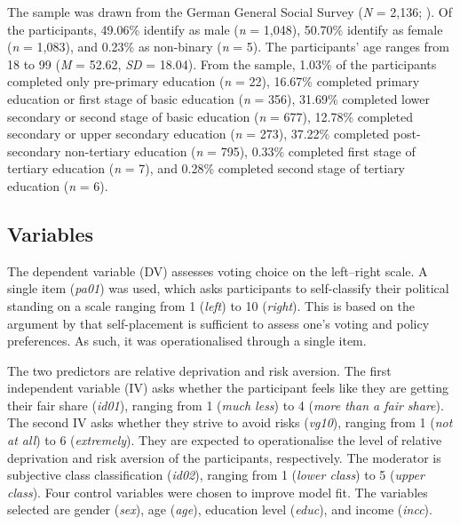 \documentclass[stu,12pt]{apa7}
\begin{document}
The sample was drawn from the German General Social Survey (\textit{N} = 2,136; \cite{ackermannGermanGeneralSocial2025}). Of the participants, 49.06\% identify as male (\textit{n} = 1,048), 50.70\% identify as female (\textit{n} = 1,083), and 0.23\% as non-binary (\textit{n} = 5). The participants’ age ranges from 18 to 99 (\textit{M} = 52.62, \textit{SD} = 18.04). From the sample, 1.03\% of the participants completed only pre-primary education (\textit{n} = 22), 16.67\% completed primary education or first stage of basic education (\textit{n} = 356), 31.69\% completed lower secondary or second stage of basic education (\textit{n} = 677), 12.78\% completed secondary or upper secondary education (\textit{n} = 273), 37.22\% completed post-secondary non-tertiary education (\textit{n} = 795), 0.33\% completed first stage of tertiary education (\textit{n} = 7), and 0.28\% completed second stage of tertiary education (\textit{n} = 6).

\subsection{Variables}

The dependent variable (DV) assesses voting choice on the left–right scale. A single item (\textit{pa01}) was used, which asks participants to self-classify their political standing on a scale ranging from 1 (\textit{left}) to 10 (\textit{right}). This is based on the argument by \textcite{lesschaevePredictivePowerLeftright2017} that self-placement is sufficient to assess one’s voting and policy preferences. As such, it was operationalised through a single item.

The two predictors are relative deprivation and risk aversion. The first independent variable (IV) asks whether the participant feels like they are getting their fair share (\textit{id01}), ranging from 1 (\textit{much less}) to 4 (\textit{more than a fair share}). The second IV asks whether they strive to avoid risks (\textit{vg10}), ranging from 1 (\textit{not at all}) to 6 (\textit{extremely}). They are expected to operationalise the level of relative deprivation and risk aversion of the participants, respectively. The moderator is subjective class classification (\textit{id02}), ranging from 1 (\textit{lower class}) to 5 (\textit{upper class}). Four control variables were chosen to improve model fit. The variables selected are gender (\textit{sex}), age (\textit{age}), education level (\textit{educ}), and income (\textit{incc}).
\end{document}
